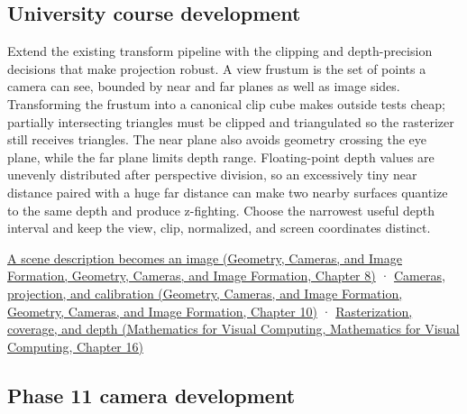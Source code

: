 \subsection{University course development}\label{appendix-1c07d64f5e70-university-course-development}

Extend the existing transform pipeline with the clipping and depth-precision decisions that make projection robust. A view frustum is the set of points a camera can see, bounded by near and far planes as well as image sides. Transforming the frustum into a canonical clip cube makes outside tests cheap; partially intersecting triangles must be clipped and triangulated so the rasterizer still receives triangles. The near plane also avoids geometry crossing the eye plane, while the far plane limits depth range. Floating-point depth values are unevenly distributed after perspective division, so an excessively tiny near distance paired with a huge far distance can make two nearby surfaces quantize to the same depth and produce z-fighting. Choose the narrowest useful depth interval and keep the view, clip, normalized, and screen coordinates distinct.

\href{../03-Geometry-Cameras-and-Image-Formation/main.pdf\#nameddest=03-visual-computing-i-ch001-a-scene-description-becomes-an-image}{A scene description becomes an image (Geometry, Cameras, and Image Formation, Geometry, Cameras, and Image Formation, Chapter 8)} · \href{../03-Geometry-Cameras-and-Image-Formation/main.pdf\#nameddest=03-visual-computing-i-ch003-cameras-projection-and-calibration}{Cameras, projection, and calibration (Geometry, Cameras, and Image Formation, Geometry, Cameras, and Image Formation, Chapter 10)} · \href{../02-Mathematics-for-Visual-Computing/main.pdf\#nameddest=03-visual-computing-i-ch012-rasterization-coverage-and-depth}{Rasterization, coverage, and depth (Mathematics for Visual Computing, Mathematics for Visual Computing, Chapter 16)}

\subsection{Phase 11 camera development}\label{appendix-1c07d64f5e70-phase-11-camera-development}

